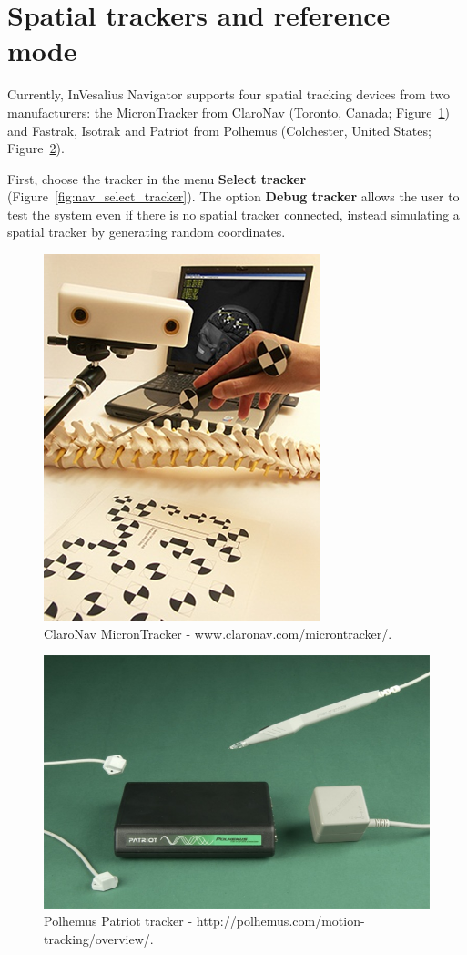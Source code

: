 \section{Spatial trackers and reference mode}

Currently, InVesalius Navigator supports four spatial tracking devices from two manufacturers: the MicronTracker from ClaroNav (Toronto, Canada; Figure~\ref{fig:tracker_claron}) and Fastrak, Isotrak and Patriot from Polhemus (Colchester, United States; Figure~\ref{fig:tracker_polhemus}).

First, choose the tracker in the menu \textbf{Select tracker} (Figure~\ref{fig:nav_select_tracker}). The option \textbf{Debug tracker} allows the user to test the system even if there is no spatial tracker connected, instead simulating a spatial tracker by generating random coordinates.

\begin{figure}[!htb]
\centering
\includegraphics[scale=0.4]{../user_guide_figures/tracker_claron.png}
\caption{ClaroNav MicronTracker - www.claronav.com/microntracker/.}
\label{fig:tracker_claron}
\end{figure}

\begin{figure}[!htb]
\centering
\includegraphics[scale=0.5]{../user_guide_figures/tracker_polhemus.jpg}
\caption{Polhemus Patriot tracker - http://polhemus.com/motion-tracking/overview/.}
\label{fig:tracker_polhemus}
\end{figure}

